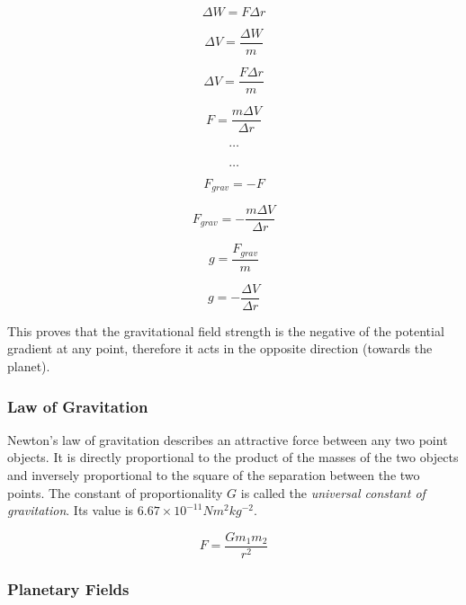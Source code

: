 \documentclass[12pt]{article}
\begin{document}
\begin{figure}[H]
\centering
\begin{minipage}{.8\textwidth}
\begin{tcolorbox}[
sharp corners=all,
colback=white,
colframe=white,
size=tight,
boxrule=0.2mm,
left=10mm, right=10mm
]
\begin{multicols}{2}
\noindent

\[\Delta W = F \Delta r\]

\[\Delta V = \dfrac{\Delta W}{m}\]

\[\Delta V = \dfrac{F \Delta r}{m}\]

\[F = \dfrac{m \Delta V}{\Delta r}\]

\[\textbf{\ldots}\]
\columnbreak
\\
\[\textbf{\ldots}\]

\[F_{grav} = -F\]

\[F_{grav} = - \dfrac{m \Delta V}{\Delta r}\]

\[g = \dfrac{F_{grav}}{m}\]

\[g = - \dfrac{\Delta V}{\Delta r}\]

\end{multicols}
\end{tcolorbox}
\end{minipage}
\end{figure}




This proves that the gravitational field strength is the negative of the potential gradient at any point, therefore it acts in the opposite direction (towards the planet).

\subsubsection{Law of Gravitation}
\label{sec:org72a0942}

Newton's law of gravitation describes an attractive force between any two point objects. It is directly proportional to the product of the masses of the two objects and inversely proportional to the square of the separation between the two points. The constant of proportionality \(G\) is called the \emph{universal constant of gravitation}. Its value is \(6.67 \times 10^{-11} \text{} Nm^2kg^{-2}\).

\[F = \dfrac{Gm_1m_2}{r^2}\]

\subsubsection{Planetary Fields}
\label{sec:orgc0bfb60}
\end{document}
